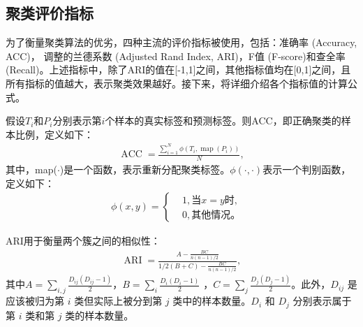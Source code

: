 \subsection{聚类评价指标}\label{clustering_metrics}
为了衡量聚类算法的优劣，四种主流的评价指标被使用，包括：准确率 (Accuracy, ACC)，
调整的兰德系数 (Adjusted Rand Index, ARI)，F值 (F-score)和查全率 (Recall)。上述指标中，除了ARI的值在[-1,1]之间，其他指标值均在[0,1]之间，且所有指标的值越大，表示聚类效果越好。接下来，将详细介绍各个指标值的计算公式。

假设$T_i$和$P_i$分别表示第$i$个样本的真实标签和预测标签。则ACC，即正确聚类的样本比例，定义如下：
\begin{align}\label{ACC}
	\operatorname{ACC} = \frac{\sum_{i=1}^N\phi(T_i, \operatorname{map}(P_i))}{N},
\end{align}
其中，map($\cdot$)是一个函数，表示重新分配聚类标签。$\phi(\cdot,\cdot)$表示一个判别函数，定义如下：
\begin{align}\label{phi}
	\phi(x,y) = \left\{
	\begin{aligned}
		&1, \text{当} x=y \text{时},& \\
		&0, \text{其他情况。}&
	\end{aligned}
	\right.
\end{align}




ARI用于衡量两个簇之间的相似性：
\begin{align}\label{ARI}
	\operatorname{ARI} = \frac{A-\frac{BC}{n(n-1)/2}}{1/2(B+C)-\frac{BC}{n(n-1)/2}},
\end{align}
其中$A=\sum_{i,j}\frac{D_{ij}(D_{ij}-1)}{2}$，$B=\sum_{i}\frac{D_{i}(D_{i}-1)}{2}$ ，$C=\sum_{j}\frac{D_{j}(D_{j}-1)}{2}$。此外，$D_{ij}$ 是应该被归为第 $i$ 类但实际上被分到第 $j$ 类中的样本数量。$D_{i}$ 和 $D_{j}$ 分别表示属于第 $i$ 类和第 $j$ 类的样本数量。

